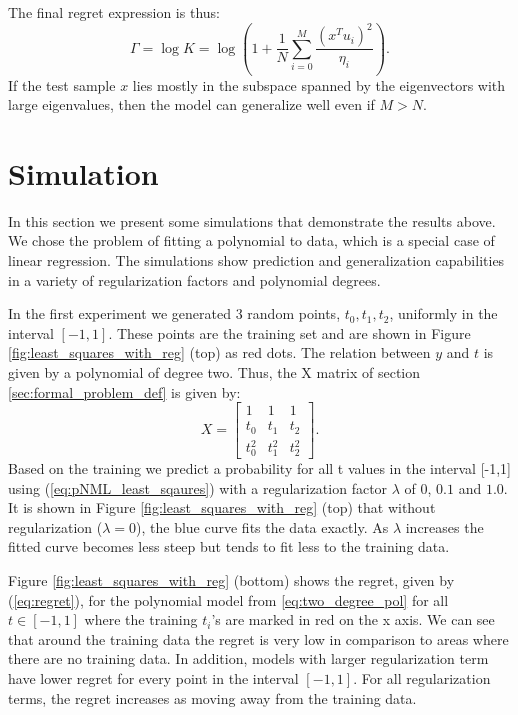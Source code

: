 \documentclass[conference,letterpaper]{IEEEtran}
\begin{document}
The final regret expression is thus:
\begin{equation}
\Gamma = \log K = \log \left(1 + \frac{1}{N} \sum_{i=0}^{M} \frac{\left(x^Tu_i\right)^2 }{\eta_i}\right).
\end{equation}
If the test sample $x$ lies mostly in the subspace spanned by the eigenvectors with large eigenvalues, then the model can generalize well even if $M>N$.

\section{Simulation} \label{sec:simulation}
In this section we present some simulations that demonstrate the results above. 
We chose the problem of fitting a polynomial to data, which is a special case of linear regression.
The simulations show prediction and generalization capabilities in a variety of regularization factors and polynomial degrees.

In the first experiment we generated 3 random points, $t_0,t_1,t_2$, uniformly in the interval $[-1, 1]$. These points are the training set and are shown in Figure \ref{fig:least_squares_with_reg} (top) as red dots. 
The relation between $y$ and $t$ is given by a polynomial of degree two.
Thus, the X matrix of section \ref{sec:formal_problem_def} is given by:
\begin{equation} \label{eq:two_degree_pol}
X = 
\begin{bmatrix}
1 & 1 & 1 \\
t_0 & t_1 & t_2 \\
t_0^2 & t_1^2 & t_2^2 
\end{bmatrix}.
\end{equation}
Based on the training we predict a probability for all t values in the interval [-1,1] using (\ref{eq:pNML_least_sqaures}) with a regularization factor $\lambda$ of $0$, $0.1$ and $1.0$. 
It is shown in Figure \ref{fig:least_squares_with_reg} (top) that without regularization ($\lambda=0$), the blue curve fits the data exactly. As $\lambda$ increases the fitted curve becomes less steep but tends to fit less to the training data.

Figure \ref{fig:least_squares_with_reg} (bottom) shows the regret, given by (\ref{eq:regret}), for the polynomial model from \eqref{eq:two_degree_pol} for all $t\in[-1,1]$ where the training $t_i$'s are marked in red on the x axis. 
We can see that around the training data the regret is very low in comparison to areas where there are no training data. 
In addition, models with larger regularization term have lower regret for every point in the interval $[-1,1]$.
For all regularization terms, the regret increases as moving away from the training data.
\end{document}
